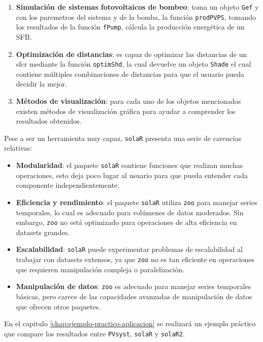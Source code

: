 \begin{enumerate}
\item \textbf{Simulación de sistemas fotovoltaicos de bombeo}: toma un objeto \texttt{Gef} y con los paremetros del sistema y de la bomba, la función \texttt{prodPVPS}, tomando los resultados de la función \texttt{fPump}, cálcula la producción energética de un SFB.
\item \textbf{Optimización de distancias}: es capaz de optimizar las distancias de un sfcr mediante la función \texttt{optimShd}, la cual devuelve un objeto \texttt{Shade} el cual contiene múltiples combinaciones de distancias para que el usuario pueda decidir la mejor.
\item \textbf{Métodos de visualización}: para cada uno de los objetos mencionados existen métodos de visualización gráfica para ayudar a comprender los resultados obtenidos.
\end{enumerate}

Pese a ser un herramienta muy capaz, \texttt{solaR} presenta una serie de carencias relativas:
\begin{itemize}
\item \textbf{Modularidad}: el paquete \texttt{solaR} contiene funciones que realizan muchas operaciones, esto deja poco lugar al usuario para que pueda entender cada componente independientemente.
\item \textbf{Eficiencia y rendimiento}: el paquete \texttt{solaR} utiliza \texttt{zoo} para manejar series temporales, lo cual es adecuado para volúmenes de datos moderados. Sin embargo, \texttt{zoo} no está optimizado para operaciones de alta eficiencia en datasets grandes.
\item \textbf{Escalabilidad}: \texttt{solaR} puede experimentar problemas de escalabilidad al trabajar con datasets extensos, ya que \texttt{zoo} no es tan eficiente en operaciones que requieren manipulación compleja o paralelización.
\item \textbf{Manipulación de datos}: \texttt{zoo} es adecuado para manejar series temporales básicas, pero carece de las capacidades avanzadas de manipulación de datos que ofrecen otros paquetes.
\end{itemize}

En el capitulo \ref{chap:ejemplo-practico-aplicacion} se realizará un ejemplo práctico que compare los resultados entre \texttt{PVsyst}, \texttt{solaR} y \texttt{solaR2}.
